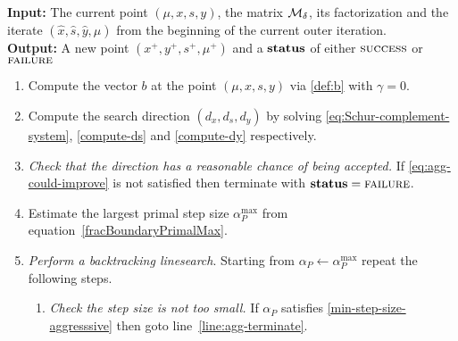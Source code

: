 \documentclass{article}
\begin{document}
\begin{algorithm}[H]
\textbf{Input:} The current point $(\mu, x, s, y)$, the matrix $\mathcal{M}_{\delta}$, its factorization and the iterate $(\hat{x}, \hat{s},  \hat{y}, \hat{\mu})$ from the beginning of the current outer iteration.  \\
\textbf{Output:} A new point $(x^{+}, y^{+}, s^{+}, \mu^{+})$ and a $\textbf{status}$ of either $\textsc{success}$ or $\textsc{failure}$
\begin{enumerate}[label*=A.{\arabic*}]
\item Compute the vector $b$ at the point $(\mu, x, s, y)$ via \eqref{def:b} with $\gamma = 0$.
\item Compute the search direction $(d_{x}, d_{s}, d_{y})$ by solving \eqref{eq:Schur-complement-system}, \eqref{compute-ds} and \eqref{compute-dy} respectively.
\item \emph{Check that the direction has a reasonable chance of being accepted.} If \eqref{eq:agg-could-improve} is not satisfied then terminate with $\textbf{status} = \textsc{failure}$.
\item Estimate the largest primal step size $\alpha^{\max}_{P}$ from equation~\eqref{fracBoundaryPrimalMax}.
\item \label{agg:line:back-track} \emph{Perform a backtracking linesearch}. Starting from $\alpha_{P} \gets \alpha^{\max}_{P}$ repeat the following steps.
\begin{enumerate}[label*=.{\arabic*}]
\item \label{line:agg-back-too-small} \emph{Check the step size is not too small.} If $\alpha_{P}$ satisfies \eqref{min-step-size-aggresssive} then goto line~\ref{line:agg-terminate}.

\end{enumerate}
\end{enumerate}
\end{algorithm}
\end{document}
